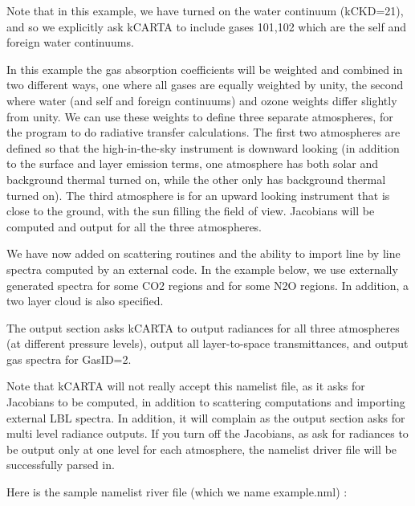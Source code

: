 \documentclass[12pt]{article}
\newcommand{\kc}{\textsf{kCARTA}\xspace}
\begin{document}
Note that in this example, we have turned on the water continuum (kCKD=21),
and so we explicitly ask \kc to include gases 101,102 which are the self and 
foreign water continuums.

In this example the gas absorption coefficients will be weighted and
combined in two  different ways, one where all gases are equally
weighted by unity, the second where water (and self and foreign continuums) 
and ozone weights differ slightly from unity. We can use these weights to 
define three separate atmospheres, for the program to do radiative transfer
calculations. The first two atmospheres are defined
so that the high-in-the-sky instrument is downward looking (in
addition to the surface and layer emission terms, one atmosphere has
both solar and background thermal turned on, while the other only
has background thermal turned on).  The third atmosphere is for an
upward looking instrument that is close to the ground, with the sun
filling the field of view.  Jacobians will be computed and output
for all the three atmospheres.

We have now added on scattering routines and the ability to import line by 
line spectra computed by an external code. In the example below, we use 
externally generated spectra for some CO2 regions and for some N2O regions. 
In addition, a two layer cloud is also specified.

The output section asks \kc to output radiances for all three
atmospheres (at different pressure levels), output all layer-to-space
transmittances, and output gas spectra for GasID=2.  

Note that \kc will not really accept this namelist file, as it asks for
Jacobians to be computed, in addition to scattering computations and 
importing external LBL spectra. In addition, it will complain as the output
section asks for multi level radiance outputs. If you turn off the Jacobians, 
as ask for radiances to be output only at one level for each atmosphere, 
the namelist driver file will be successfully parsed in.

Here is the sample namelist river file (which we name example.nml) :
\end{document}
